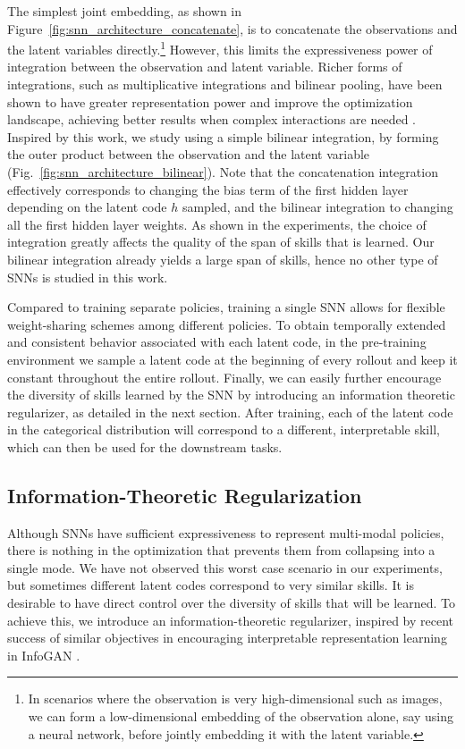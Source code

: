 \documentclass{article} %
\begin{document}
The simplest joint embedding, as shown in Figure~\ref{fig:snn_architecture_concatenate}, is to concatenate the observations and the latent variables directly.\footnote{In scenarios where the observation is very high-dimensional such as images, we can form a low-dimensional embedding of the observation alone, say using a neural network, before jointly embedding it with the latent variable.} However, this limits the expressiveness power of integration between the observation and latent variable. Richer forms of integrations, such as multiplicative integrations and bilinear pooling, have been shown to have greater representation power and improve the optimization landscape, achieving better results when complex interactions are needed \citep{fukui2016multimodal, wu2016multiplicative}. Inspired by this work, we study using a simple bilinear integration, by forming the outer product between the observation and the latent variable (Fig.~\ref{fig:snn_architecture_bilinear}). Note that the concatenation integration effectively corresponds to changing the bias term of the first hidden layer depending on the latent code $h$ sampled, and the bilinear integration to changing all the first hidden layer weights. As shown in the experiments, the choice of integration greatly affects the quality of the span of skills that is learned. Our bilinear integration already yields a large span of skills, hence no other type of SNNs is studied in this work.


Compared to training separate policies, training a single SNN allows for flexible weight-sharing schemes among different policies. 
To obtain temporally extended and consistent behavior associated with each latent code, in the pre-training environment we sample a latent code at the beginning of every rollout and keep it constant throughout the entire rollout.
Finally, we can easily further encourage the diversity of skills learned by the SNN by introducing an information theoretic regularizer, as detailed in the next section. 
After training, each of the latent code in the categorical distribution will correspond to a different, interpretable skill, which can then be used for the downstream tasks.


\subsection{Information-Theoretic Regularization}
\label{section:method:inforeg}

Although SNNs have sufficient expressiveness to represent multi-modal policies, there is nothing in the optimization that prevents them from collapsing into a single mode. We have not observed this worst case scenario in our experiments, but sometimes different latent codes correspond to very similar skills. It is desirable to have direct control over the diversity of skills that will be learned. To achieve this, we introduce an information-theoretic regularizer, inspired by recent success of similar objectives in encouraging interpretable representation learning in InfoGAN \cite{chen2016infogan}.
\end{document}
